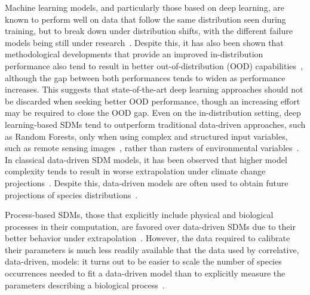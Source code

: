 Machine learning models, and particularly those based on deep learning, are known to perform well on data that follow the same distribution seen during training, but to break down under distribution shifts, with the different failure models being still under research~\cite{nagarajan2020understanding}.
Despite this, it has also been shown that methodological developments that provide an improved in-distribution performance also tend to result in better out-of-distribution (OOD) capabilities~\cite{miller2021accuracy}, although the gap between both performances tends to widen as performance increases. 
This suggests that state-of-the-art deep learning approaches should not be discarded when seeking better OOD performance, though an increasing effort may be required to close the OOD gap.
Even on the in-distribution setting, deep learning-based SDMs tend to outperform traditional data-driven approaches, such as Random Forests, only when using complex and structured input variables, such as remote sensing images~\cite{deneu2021convolutional}, rather than rasters of environmental variables~\cite{kellenberger2024performance}.
In classical data-driven SDM models, it has been observed that higher model complexity tends to result in worse extrapolation under climate change projections~\cite{brun2020model}.
Despite this, data-driven models are often used to obtain future projections of species distributions~\cite{brun2016predictive,harris2018forecasting,brodie2022recommendations,barnes2022climate}.


Process-based SDMs, those that explicitly include physical and biological processes in their computation, are favored over data-driven SDMs due to their better behavior under extrapolation~\cite{urban2016improving,briscoe2019forecasting}.
However, the data required to calibrate their parameters is much less readily available that the data used by correlative, data-driven, models: it turns out to be easier to scale the number of species occurrences needed to fit a data-driven model than to explicitly measure the parameters describing a biological process~\cite{urban2016improving}.

